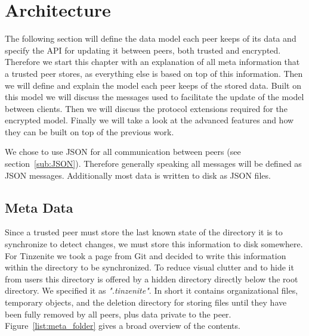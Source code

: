 \chapter{Architecture}
\label{chap:architecture}

The following section will define the data model each peer keeps of its data and specify the API for updating it between peers, both trusted and encrypted.
Therefore we start this chapter with an explanation of all meta information that a trusted peer stores, as everything else is based on top of this information.
Then we will define and explain the model each peer keeps of the stored data.
Built on this model we will discuss the messages used to facilitate the update of the model between clients.
Then we will discuss the protocol extensions required for the encrypted model.
Finally we will take a look at the advanced features and how they can be built on top of the previous work.

We chose to use JSON for all communication between peers (see section~\ref{sub:JSON}).
Therefore generally speaking all messages will be defined as JSON messages.
Additionally most data is written to disk as JSON files.

\section{Meta Data}
\label{sec:Meta Data}

Since a trusted peer must store the last known state of the directory it is to synchronize to detect changes, we must store this information to disk somewhere.
For Tinzenite we took a page from Git and decided to write this information within the directory to be synchronized.
To reduce visual clutter and to hide it from users this directory is offered by a hidden directory directly below the root directory.
We specified it as \textit{".tinzenite"}.
In short it contains organizational files, temporary objects, and the deletion directory for storing files until they have been fully removed by all peers, plus data private to the peer.
Figure~\ref{list:meta_folder} gives a broad overview of the contents.

